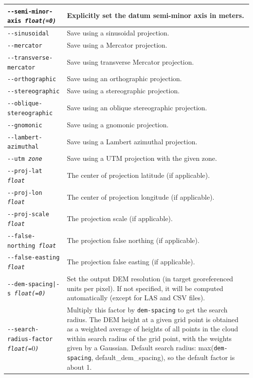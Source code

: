 \begin{longtable}{|p{8cm}|p{9cm}|}
\texttt{-\/-semi-minor-axis \textit{float(=0)}} & Explicitly set the datum semi-minor axis in meters.\\ \hline
\texttt{-\/-sinusoidal} & Save using a sinusoidal projection. \\ \hline
\texttt{-\/-mercator} & Save using a Mercator projection. \\ \hline
\texttt{-\/-transverse-mercator} & Save using transverse Mercator projection. \\ \hline
\texttt{-\/-orthographic} & Save using an orthographic projection. \\ \hline
\texttt{-\/-stereographic} & Save using a stereographic projection. \\ \hline
\texttt{-\/-oblique-stereographic} & Save using an oblique stereographic projection. \\ \hline
\texttt{-\/-gnomonic} & Save using a gnomonic projection. \\ \hline
\texttt{-\/-lambert-azimuthal} & Save using a Lambert azimuthal projection. \\ \hline
\texttt{-\/-utm \textit{zone}} & Save using a UTM projection with the given zone. \\ \hline
\texttt{-\/-proj-lat \textit{float}} & The center of projection latitude (if applicable). \\ \hline
\texttt{-\/-proj-lon \textit{float}} & The center of projection longitude (if applicable). \\ \hline
\texttt{-\/-proj-scale \textit{float}} & The projection scale (if applicable). \\ \hline
\texttt{-\/-false-northing \textit{float}} & The projection false northing (if applicable). \\ \hline
\texttt{-\/-false-easting \textit{float}} & The projection false easting (if applicable). \\ \hline
\texttt{-\/-dem-spacing|-s \textit{float(=0)}} & Set the output DEM resolution (in target georeferenced units per pixel). If not specified, it will be computed automatically (except for LAS and CSV files). \\ \hline
\texttt{-\/-search-radius-factor \textit{float(=$0$)}} & Multiply this factor by \texttt{dem-spacing} to get the search radius. The DEM height at a given grid point is obtained as a weighted average of heights of all points in the cloud within search radius of the grid point, with the weights given by a Gaussian. Default search radius: max(\texttt{dem-spacing}, default\_dem\_spacing), so the default factor is about 1.\\ \hline


\end{longtable}
